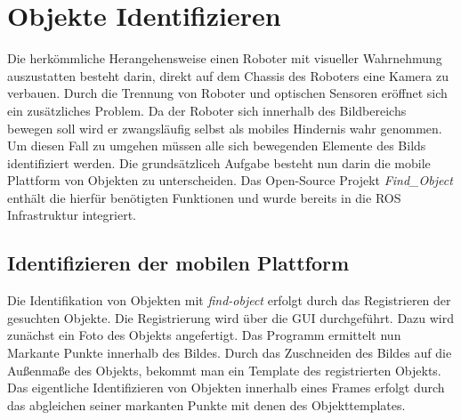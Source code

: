 \section{Objekte Identifizieren}
Die herkömmliche Herangehensweise einen Roboter mit visueller Wahrnehmung auszustatten besteht darin, direkt auf dem Chassis des Roboters eine Kamera zu verbauen. Durch die Trennung von Roboter und optischen Sensoren eröffnet sich ein zusätzliches Problem. Da der Roboter sich innerhalb des Bildbereichs bewegen soll wird er zwangsläufig selbst als mobiles Hindernis wahr genommen. Um diesen Fall zu umgehen müssen alle sich bewegenden Elemente des Bilds identifiziert werden. Die grundsätzliceh Aufgabe besteht nun darin die mobile Plattform von Objekten zu unterscheiden. Das Open-Source Projekt \textit{Find\_Object} enthält die hierfür benötigten Funktionen und wurde bereits in die ROS Infrastruktur integriert.

	\subsection{Identifizieren der mobilen Plattform}
	Die Identifikation von Objekten mit \textit{find-object} erfolgt durch das Registrieren der gesuchten Objekte. Die Registrierung wird über die GUI durchgeführt. Dazu wird zunächst ein Foto des Objekts angefertigt. Das Programm ermittelt nun Markante Punkte innerhalb des Bildes. Durch das Zuschneiden des Bildes auf die Außenmaße des Objekts, bekommt man ein Template des registrierten Objekts. Das eigentliche Identifizieren von Objekten innerhalb eines Frames erfolgt durch das abgleichen seiner markanten Punkte mit denen des Objekttemplates.\newline \cite{find-object-ros} \cite{find-object}
	
